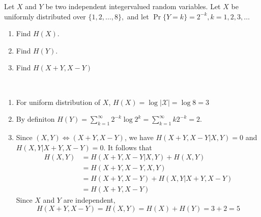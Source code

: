 \begin{exercise}{Let $X$ and $Y$ be two independent integervalued random variables. Let $X$ be uniformly distributed over $\{1,2, \ldots, 8\},$ and let $\operatorname{Pr}\{Y=k\}=2^{-k}, k=1,2,3, \ldots$
  \begin{enumerate}
    \item Find $H(X)$.
    \item Find $H(Y)$.
    \item Find $H(X+Y, X-Y)$
  \end{enumerate}}
  \begin{solution}
    \par{~}
    \begin{enumerate}
      \item {
        For uniform distribution of $X$, $H(X) = \log |\mathcal{X}| = \log 8 = 3$
      }
      \item By definiton $H(Y) = \sum_{k=1}^{\infty} 2^{-k} \log 2^{k} = \sum_{k=1}^{\infty} k 2^{-k} = 2$.
      \item Since $(X,Y) \Leftrightarrow (X+Y,X-Y)$, we have $H(X+Y,X-Y|X,Y)=0$ and $H(X,Y|X+Y,X-Y) =0$. It follows that
      \begin{equation}
        \begin{aligned}
          H(X,Y) &= H(X+Y,X-Y|X,Y) + H(X,Y) \\
          &= H(X+Y,X-Y,X,Y) \\
          &= H(X+Y,X-Y) + H(X,Y|X+Y,X-Y) \\
          &= H(X+Y,X-Y)
        \end{aligned}
      \end{equation}
      Since $X$ and $Y$ are independent,
      $$H(X+Y,X-Y) = H(X,Y) = H(X) +H(Y) = 3 + 2 =5$$
    \end{enumerate}




  \end{solution}
  \label{ex4}
\end{exercise}
